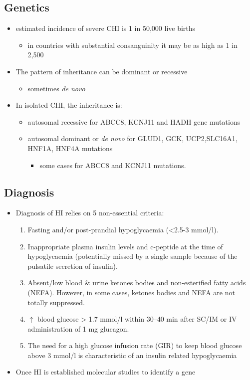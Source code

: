 \documentclass{scrartcl}
\begin{document}
\subsection{Genetics}
\label{sec:org463fe3b}
\begin{itemize}
\item estimated incidence of severe CHI is 1 in 50,000 live births
\begin{itemize}
\item in countries with substantial consanguinity it may be as high as 1 in 2,500
\end{itemize}
\item The pattern of inheritance can be dominant or recessive
\begin{itemize}
\item sometimes \emph{de novo}
\end{itemize}
\item In isolated CHI, the inheritance is:
\begin{itemize}
\item autosomal recessive for ABCC8, KCNJ11 and HADH gene mutations
\item autosomal dominant or \emph{de novo} for GLUD1, GCK, UCP2,SLC16A1, HNF1A, HNF4A mutations
\begin{itemize}
\item some cases for ABCC8 and KCNJ11 mutations.
\end{itemize}
\end{itemize}
\end{itemize}

\subsection{Diagnosis}
\label{sec:org848b945}
\begin{itemize}
\item Diagnosis of HI relies on 5 non-essential criteria:
\begin{enumerate}
\item Fasting and/or post-prandial hypoglycaemia (<2.5-3 mmol/l).
\item Inappropriate plasma insulin levels and c-peptide at the time of
hypoglycaemia (potentially missed by a single sample because of
the pulsatile secretion of insulin).
\item Absent/low blood \& urine ketones bodies and non-esterified fatty
acids (NEFA). However, in some cases, ketones bodies and NEFA are
not totally suppressed.
\item \(\uparrow\) blood glucose \textgreater{} 1.7 mmol/l within 30–40 min after
SC/IM or IV administration of 1 mg glucagon.
\item The need for a high glucose infusion rate (GIR) to keep blood
glucose above 3 mmol/l is characteristic of an insulin related
hypoglycaemia
\end{enumerate}

\item Once HI is established molecular studies to identify a gene
\end{itemize}
\end{document}

